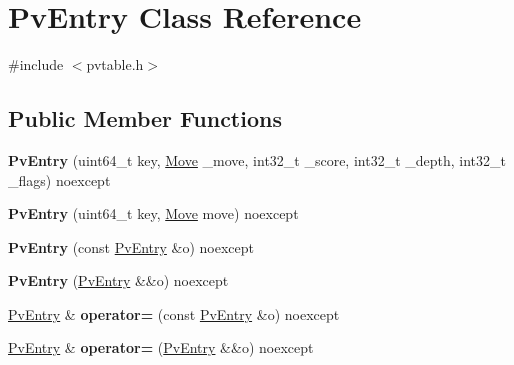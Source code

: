 \hypertarget{classPvEntry}{}\section{Pv\+Entry Class Reference}
\label{classPvEntry}


{\ttfamily \#include $<$pvtable.\+h$>$}

\subsection*{Public Member Functions}
\begin{DoxyCompactItemize}
\item 
\mbox{\label{classPvEntry_afeeef31547873fa5fc9aa09ab4c4f06b}} 
{\bfseries Pv\+Entry} (uint64\+\_\+t key, \mbox{\hyperlink{classMove}{Move}} \+\_\+move, int32\+\_\+t \+\_\+score, int32\+\_\+t \+\_\+depth, int32\+\_\+t \+\_\+flags) noexcept
\item 
\mbox{\label{classPvEntry_ace4807fc22c58c833b65cf13ac09908a}} 
{\bfseries Pv\+Entry} (uint64\+\_\+t key, \mbox{\hyperlink{classMove}{Move}} move) noexcept
\item 
\mbox{\label{classPvEntry_af33c5a8a15b3b08ba46255cd6b83b52e}} 
{\bfseries Pv\+Entry} (const \mbox{\hyperlink{classPvEntry}{Pv\+Entry}} \&o) noexcept
\item 
\mbox{\label{classPvEntry_ac55e594a47f0c00b0f32dcc41cb741ba}} 
{\bfseries Pv\+Entry} (\mbox{\hyperlink{classPvEntry}{Pv\+Entry}} \&\&o) noexcept
\item 
\mbox{\label{classPvEntry_aa435b3aa50a3820f911a38daece696ad}} 
\mbox{\hyperlink{classPvEntry}{Pv\+Entry}} \& {\bfseries operator=} (const \mbox{\hyperlink{classPvEntry}{Pv\+Entry}} \&o) noexcept
\item 
\mbox{\label{classPvEntry_aef1422ab13067d76d00d879ff053cd0b}} 
\mbox{\hyperlink{classPvEntry}{Pv\+Entry}} \& {\bfseries operator=} (\mbox{\hyperlink{classPvEntry}{Pv\+Entry}} \&\&o) noexcept
\end{DoxyCompactItemize}
